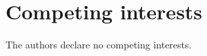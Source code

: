 \documentclass[superscriptaddress,unsortedaddress,
 amsmath,amssymb,
 aps,
]{revtex4-2}
\begin{document}

\section*{Competing interests}
The authors declare no competing interests.
\end{document}
